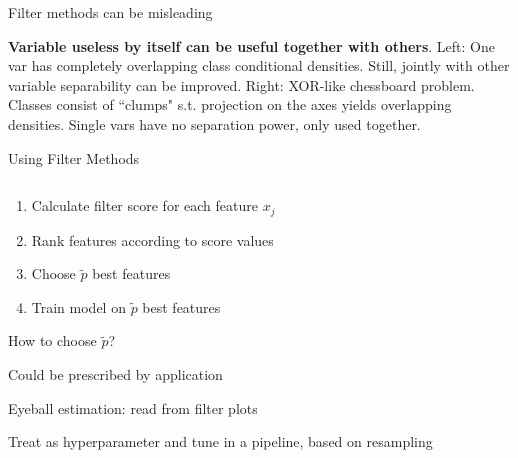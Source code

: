 \documentclass[11pt,compress,t,notes=noshow, xcolor=table]{beamer}
\begin{document}
\begin{vbframe}{Filter methods can be misleading}
\begin{figure}
\begin{minipage}{0.45\textwidth}
    \end{minipage}
    \end{figure}
\vspace{0.3cm}
\footnotesize{\textbf{Variable useless by itself can be useful together with others}. Left: One var has completely overlapping class conditional densities. Still, jointly with other variable separability can be improved. Right: XOR-like chessboard problem. Classes consist of ``clumps" s.t. projection on the axes yields overlapping densities. Single vars have no separation power, only used together.}


\end{vbframe}

\begin{vbframe}{Using Filter Methods}



  \begin{columns}
    \begin{column}{0.65\textwidth}
      \begin{enumerate}{}
        \setlength{\itemsep}{1.2em}
          \item Calculate filter score for each feature $x_j$
          \item Rank features according to score values
          \item Choose $\tilde{p}$ best features
          \item Train model on $\tilde{p}$ best features
        \end{enumerate}

        \begin{blocki}{How to choose $\tilde{p}$?}
          \item Could be prescribed by application
          \item Eyeball estimation: read from filter plots
          \item Treat as hyperparameter and tune in a pipeline, based on resampling
        \end{blocki}
    \end{column}


\end{columns}
\end{vbframe}
\end{document}
